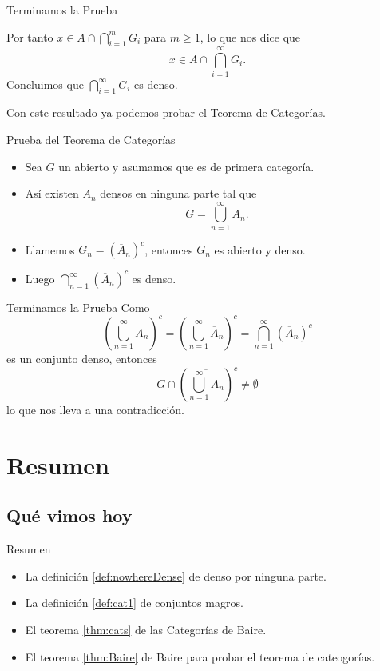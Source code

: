 \documentclass[utf8]{beamer}
\theoremstyle{plain}
\theoremstyle{definition}
\theoremstyle{remark}
\numberwithin{equation}{section}
\renewcommand{\geq}{\geqslant}          %
\newcommand{\ov}{\overline}
\newcommand{\sucn}{_{n=1}^\infty} %
\begin{document}
\begin{frame}{Terminamos la Prueba}
  
  Por tanto $x\in A\cap\bigcap_{i=1}^m G_i$ para $m\geq 1$, lo que nos dice que 
  $$x\in A\cap\bigcap_{i=1}^\infty G_i.$$
  Concluimos que $\bigcap_{i=1}^\infty G_i$ es denso.\par 
  Con este resultado ya podemos probar el Teorema de Categorías.
\end{frame}

\begin{frame}{Prueba del Teorema de Categorías}
  \begin{itemize}
    \item Sea $G$ un abierto y asumamos que es de primera categoría.
    \item Así existen $A_n$ densos en ninguna parte tal que 
     $$G=\bigcup\sucn A_n.$$
    \item Llamemos $G_n=(\ov A_n)^c$, entonces $G_n$ es abierto y denso.
    \item Luego $\bigcap\sucn (\ov{A}_n)^c$ es denso.
  \end{itemize}
\end{frame}

\begin{frame}{Terminamos la Prueba}
  Como
  $$\left(\ov{\bigcup\sucn A_n}\right)^c=\left({\bigcup\sucn \ov A_n}\right)^c=\bigcap\sucn (\ov A_n)^c$$
  es un conjunto denso, entonces 
  $$G\cap \left(\ov{\bigcup\sucn A_n}\right)^c\neq\emptyset$$
  lo que nos lleva a una contradicción.
\end{frame}

\section*{Resumen}

\subsection*{Qu\'e vimos hoy}
\begin{frame}{Resumen}

  \begin{itemize}
  \item La definición \ref{def:nowhereDense} de denso por ninguna parte.
  \item La definición \ref{def:cat1} de conjuntos magros.
  \item El teorema \ref{thm:cats} de las Categorías de Baire.
  \item El teorema \ref{thm:Baire} de Baire para probar el teorema de cateogorías.
  \end{itemize}
  
\end{frame}
\iffalse
\end{document}
